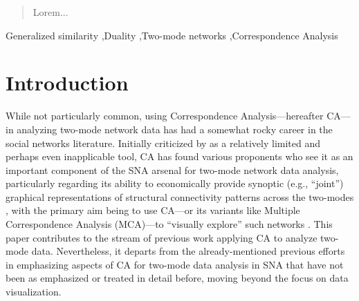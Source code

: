 \documentclass[a4paper,fleqn]{cas-sc}
\begin{document}
\begin{abstract}
Lorem...
\end{abstract}


\begin{highlights}
    \item 
    \item 
    \item 
\end{highlights}

\begin{keywords}
Generalized similarity \sep Duality \sep Two-mode networks \sep Correspondence Analysis
\end{keywords}

\maketitle
\newpage
\section{Introduction}
While not particularly common, using Correspondence Analysis---hereafter CA---in analyzing two-mode network data has had a somewhat rocky career in the social networks literature. Initially criticized by \citet{borgatti1997network} as a relatively limited and perhaps even inapplicable tool, CA has found various proponents who see it as an important component of the SNA arsenal for two-mode network data analysis, particularly regarding its ability to economically provide synoptic (e.g., ``joint'') graphical representations of structural connectivity patterns across the two-modes \citep{roberts2000correspondence, breiger2000tool, faust2005using}, with the primary aim being to use CA---or its variants like Multiple Correspondence Analysis (MCA)---to ``visually explore'' such networks \citep{d2014use}. This paper contributes to the stream of previous work applying CA to analyze two-mode data. Nevertheless, it departs from the already-mentioned previous efforts in emphasizing aspects of CA for two-mode data analysis in SNA that have not been as emphasized or treated in detail before, moving beyond the focus on data visualization. 
\end{document}
